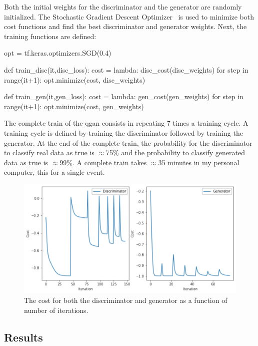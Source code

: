 Both the initial weights for the discriminator and the generator are randomly
initialized. 
The Stochastic Gradient Descent Optimizer~\cite{SGC} is used to minimize both 
cost functions and find the best discriminator and generator weights. Next,
the training functions are defined:
\begin{python}
opt = tf.keras.optimizers.SGD(0.4)

def train_disc(it,disc_loss):
    cost = lambda: disc_cost(disc_weights)
    for step in range(it+1):
        opt.minimize(cost, disc_weights) 

def train_gen(it,gen_loss):
    cost = lambda: gen_cost(gen_weights)
    for step in range(it+1):
        opt.minimize(cost, gen_weights)
\end{python}

The complete train of the \gls{qgan} consists in repeating 7 times a training 
cycle. A training cycle is defined by training the discriminator followed by 
training the generator.
At the end of the complete train, the probability for the discriminator to 
classify real data as true is $\approx$75\% and the probability to classify 
generated data as true is $\approx$99\%. A complete train takes $\approx$35 
minutes in my personal computer, this for a single event.

\begin{figure}[!htbp]
\centering
    \includegraphics[width=1\textwidth]{figures/costs.pdf}
\caption{The cost for both the discriminator and generator as a function of 
        number of iterations.}
\label{fig:costs}
\end{figure}

\subsection{Results}
\label{sec:res}

